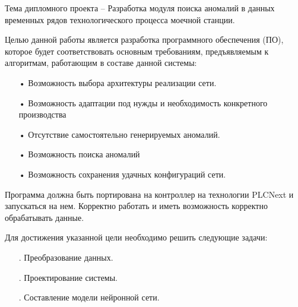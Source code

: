 {\gostFont
	
	\par \redline Тема дипломного проекта {--} Разработка модуля поиска аномалий в данных временных рядов технологического процесса моечной станции.
	\par \redline Целью данной работы является разработка программного обеспечения (ПО), которое будет соответствовать основным требованиям, предъявляемым к алгоритмам, работающим в составе данной системы:
	
	\begin{itemize}[leftmargin=2.15cm, labelwidth=0.65cm, labelsep=0.0cm] 
		
		\item[• ] Возможность выбора архитектуры реализации сети.		
		\addtocounter{itemcntr}{1}
				
		\item[• ] Возможность адаптации под нужды и необходимость конкретного производства		
		\addtocounter{itemcntr}{1}
		
		\item[• ] Отсутствие самостоятельно генерируемых аномалий. 		
		\addtocounter{itemcntr}{1}
		
		\item[• ] Возможность поиска аномалий 
		\addtocounter{itemcntr}{1}
		
		\item[• ] Возможность сохранения удачных конфигураций сети.		
		\addtocounter{itemcntr}{1}
		
		\setcounter{itemcntr}{1}
	\end{itemize} 	
	
	\par \redline Программа должна быть портирована на контроллер на технологии PLCNext и запускаться на нем. Корректно работать и иметь возможность корректно обрабатывать данные. 
	\par \redline Для достижения указанной цели необходимо решить следующие задачи:
	
	\begin{itemize}[leftmargin=2.15cm, labelwidth=0.65cm, labelsep=0.0cm] 
		
		\item[\theitemcntr. ] Преобразование данных.		
		\addtocounter{itemcntr}{1}
		
		\item[\theitemcntr. ] Проектирование системы.		
		\addtocounter{itemcntr}{1}
		
		\item[\theitemcntr. ] Составление модели нейронной сети.		
		\addtocounter{itemcntr}{1}
		

\end{itemize}}
